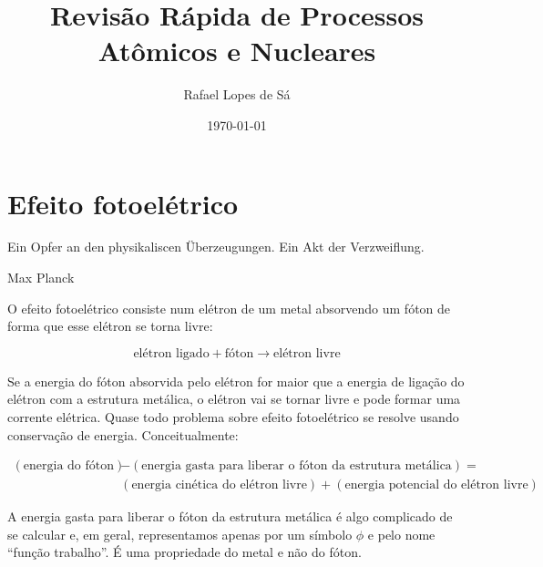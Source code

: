 \documentclass{article}
\title{Revis\~ao R\'apida de Processos At\^omicos e Nucleares}
\author{Rafael Lopes de S\'a}
\date{\today}
\begin{document}
\maketitle
\tableofcontents

\newpage

\section{Efeito fotoel\'etrico}

\epigraph{Ein Opfer an den physikaliscen Überzeugungen. Ein Akt der Verzweiflung.}{Max Planck}

O efeito fotoel\'etrico consiste num el\'etron de um metal absorvendo um f\'oton de forma que esse el\'etron se torna livre:

\begin{equation}
\text{el\'etron ligado} + \text{f\'oton} \rightarrow \text{el\'etron livre}
\end{equation}



Se a energia do f\'oton absorvida pelo el\'etron for maior que a energia de liga\c c\~ao do el\'etron com a estrutura met\'alica, o el\'etron vai se tornar livre e pode formar uma corrente el\'etrica. Quase todo problema sobre efeito fotoel\'etrico se resolve usando conserva\c c\~ao de energia. Conceitualmente:

\begin{equation}
\begin{split}
(\text{energia do f\'oton}) &- (\text{energia gasta para liberar o f\'oton da estrutura met\'alica}) = \\
&(\text{energia cin\'etica do el\'etron livre}) + (\text{energia potencial do el\'etron livre})
\end{split}
\end{equation}

A energia gasta para liberar o f\'oton da estrutura met\'alica \'e algo complicado de se calcular e, em geral, representamos apenas por um s\'imbolo $\phi$ e pelo nome ``fun\c c\~ao trabalho''. \'E uma propriedade do metal e n\~ao do f\'oton.
\end{document}
